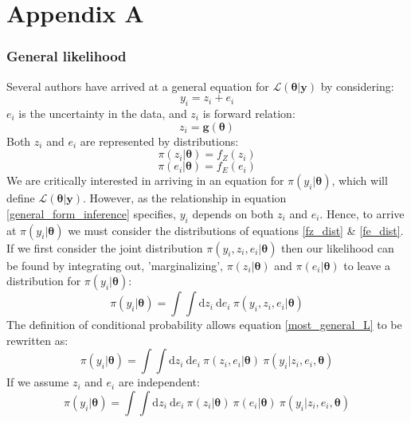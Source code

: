 \chapter{Appendix A}
\label{AppendixA}

\subsection{General likelihood}
Several authors \citet{gregory2005bayesian} have arrived at a general equation for $\mathcal{L}(\bm{\theta}|\bm{y})$ by considering:
\begin{equation}
y_i = z_i + e_i
\label{general_form_inference}
\end{equation}
$e_i$ is the uncertainty in the data, and $z_i$ is forward relation:
\begin{equation}
z_i = \bm{g}(\bm{\theta})
\end{equation}
Both $z_i$ and $e_i$ are represented by distributions:
\begin{equation}
\pi(z_i|\bm{\theta}) = f_Z(z_i)
\label{fz_dist}
\end{equation}
\begin{equation}
\pi(e_i|\bm{\theta}) = f_E(e_i)
\label{fe_dist}
\end{equation}
We are critically interested in arriving in an equation for $\pi(y_i|\bm{\theta})$, which will define $\mathcal{L}(\bm{\theta}|\bm{y})$. However, as the relationship in equation \ref{general_form_inference} specifies, $y_i$ depends on both $z_i$ and $e_i$. Hence, to arrive at $\pi(y_i|\bm{\theta})$ we must consider the distributions of equations \ref{fz_dist} \& \ref{fe_dist}. If we first consider the joint distribution $\pi(y_i,z_i,e_i|\bm{\theta})$ then our likelihood can be found by integrating out, 'marginalizing', $\pi(z_i|\bm{\theta})$ and $\pi(e_i|\bm{\theta})$ to leave a distribution for $\pi(y_i|\bm{\theta})$:
\begin{equation}
\pi(y_i|\bm{\theta}) = \int \int \text{d}z_i\ \text{d}e_i\ \pi(y_i,z_i,e_i|\bm{\theta})
\label{most_general_L}
\end{equation}
The definition of conditional probability allows equation \ref{most_general_L} to be rewritten as:
\begin{equation}
\pi(y_i|\bm{\theta}) = \int \int \text{d}z_i\ \text{d}e_i\ \pi(z_i,e_i|\bm{\theta})\ \pi(y_i|z_i,e_i,\bm{\theta})
\end{equation}
If we assume $z_i$ and $e_i$ are independent:
\begin{equation}
\pi(y_i|\bm{\theta}) = \int \int \text{d}z_i\ \text{d}e_i\ \pi(z_i|\bm{\theta})\ \pi(e_i|\bm{\theta})\ \pi(y_i|z_i,e_i,\bm{\theta})
\label{halfway_through_derivation}
\end{equation}

